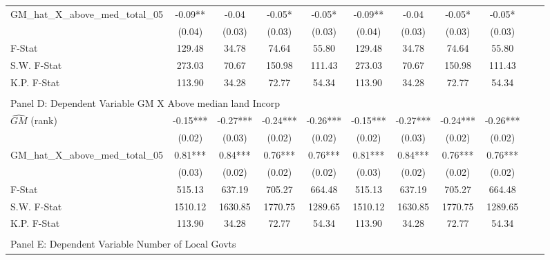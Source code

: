 \begin{table}[htbp]
\begin{threeparttable}
\begin{tabular}{l*{10}{c}}
\addlinespace
GM\_hat\_X\_above\_med\_total\_05&      -0.09** &      -0.04   &      -0.05*  &      -0.05*  &      -0.09** &      -0.04   &      -0.05*  &      -0.05*  \\
                &     (0.04)   &     (0.03)   &     (0.03)   &     (0.03)   &     (0.04)   &     (0.03)   &     (0.03)   &     (0.03)   \\
\midrule
F-Stat          &     129.48   &      34.78   &      74.64   &      55.80   &     129.48   &      34.78   &      74.64   &      55.80   \\
S.W. F-Stat     &     273.03   &      70.67   &     150.98   &     111.43   &     273.03   &      70.67   &     150.98   &     111.43   \\
K.P. F-Stat     &     113.90   &      34.28   &      72.77   &      54.34   &     113.90   &      34.28   &      72.77   &      54.34   \\
\cmidrule[\heavyrulewidth](lr){1-9} \\ \cmidrule[\heavyrulewidth](lr){1-9}
\multicolumn{8}{l}{Panel D: Dependent Variable GM X Above median land Incorp}\\
\cmidrule(lr){1-9}
$\hat{GM}$ (rank)&      -0.15***&      -0.27***&      -0.24***&      -0.26***&      -0.15***&      -0.27***&      -0.24***&      -0.26***\\
                &     (0.02)   &     (0.03)   &     (0.02)   &     (0.02)   &     (0.02)   &     (0.03)   &     (0.02)   &     (0.02)   \\
\addlinespace
GM\_hat\_X\_above\_med\_total\_05&       0.81***&       0.84***&       0.76***&       0.76***&       0.81***&       0.84***&       0.76***&       0.76***\\
                &     (0.03)   &     (0.02)   &     (0.02)   &     (0.02)   &     (0.03)   &     (0.02)   &     (0.02)   &     (0.02)   \\
\midrule
F-Stat          &     515.13   &     637.19   &     705.27   &     664.48   &     515.13   &     637.19   &     705.27   &     664.48   \\
S.W. F-Stat     &    1510.12   &    1630.85   &    1770.75   &    1289.65   &    1510.12   &    1630.85   &    1770.75   &    1289.65   \\
K.P. F-Stat     &     113.90   &      34.28   &      72.77   &      54.34   &     113.90   &      34.28   &      72.77   &      54.34   \\
\cmidrule[\heavyrulewidth](lr){1-9} \\ \cmidrule[\heavyrulewidth](lr){1-9}
\multicolumn{8}{l}{Panel E: Dependent Variable Number of Local Govts}\\

\end{tabular}
\end{threeparttable}
\end{table}
